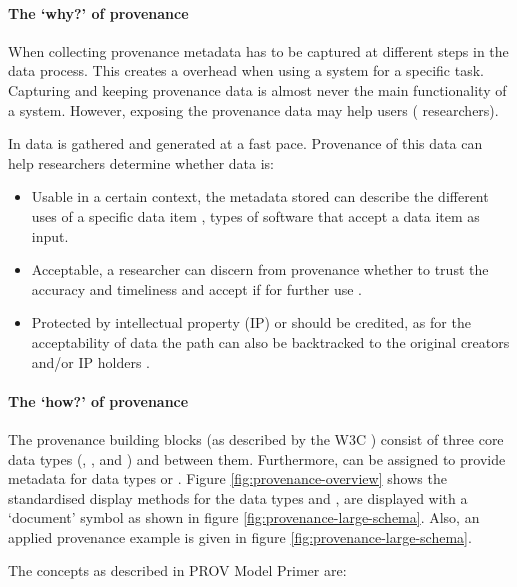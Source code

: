 \paragraph{The `why?' of provenance}
\label{provenance-why}

When collecting provenance  metadata has to be captured at different steps in the data process.
This creates a overhead when using a system for a specific task.
Capturing and keeping provenance data is almost never the main functionality of a system.
However, exposing the provenance data may help users (\ie{} researchers).

In \escience{} data is gathered and generated at a fast pace.
Provenance of this data can help researchers determine whether data is:

\begin{itemize}
	\item Usable in a certain context, the metadata stored can describe the different uses of a specific data item \cite{dsp1simmhan}, \eg{} types of software that accept a data item as input.
	\item Acceptable, a researcher can discern from provenance whether to trust the accuracy and timeliness and accept if for further use \cite{dsp1simmhan,dsp3buneman}.
	\item Protected by intellectual property (IP) or should be credited, as for the acceptability of data the path can also be backtracked to the original creators and/or IP holders \cite{dsp1simmhan}.
\end{itemize}

\paragraph{The `how?' of provenance}
\label{provenance-how}

The provenance building blocks (as described by the W3C \cite{dsp8gil}) consist of three core data types (\agent{}, \entity{}, and \activity{}) and \relations{} between them.
Furthermore, \attributes{} can be assigned to provide metadata for data types or \relations{}.
Figure \ref{fig:provenance-overview} shows the standardised display methods for the data types and \relations{}, \attributes{} are displayed with a `document' symbol as shown in figure \ref{fig:provenance-large-schema}.
Also, an applied provenance example is given in figure \ref{fig:provenance-large-schema}.

The concepts as described in PROV Model Primer \cite{dsp8gil} are:

